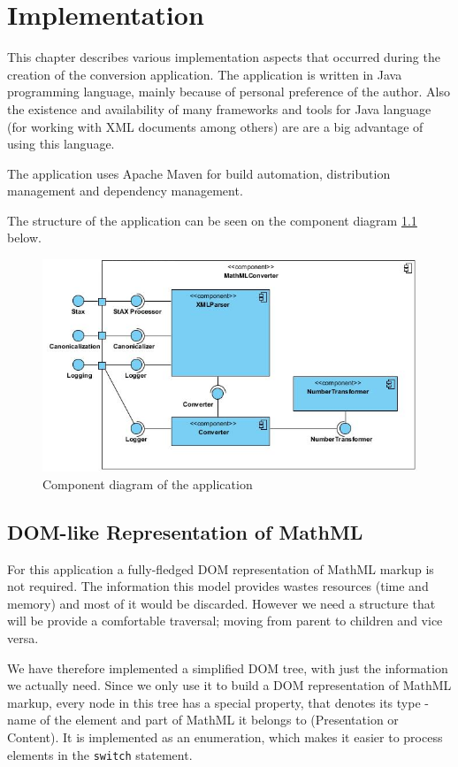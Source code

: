 \documentclass[11pt,oneside,final]{fithesis2}
\begin{document}
\chapter{Implementation}
This chapter describes various implementation aspects that occurred during the creation of the conversion application. The application is written in Java programming language, mainly because of personal preference of the author. Also the existence and availability of many frameworks and tools for Java language (for working with XML documents among others) are are a big advantage of using this language. 

The application uses Apache Maven for build automation, distribution management and dependency management.

The structure of the application can be seen on the component diagram \ref{fig:componentdiagram} below.

\begin{figure}[!ht]
\centering
\includegraphics[width=\textwidth]{component_diagram}
\caption{Component diagram of the application}
\label{fig:componentdiagram}
\end{figure}

\section{DOM-like Representation of MathML}
For this application a fully-fledged DOM representation of MathML markup is not required. The information this model provides wastes resources (time and memory) and most of it would be discarded. However we need a structure that will be provide a comfortable traversal; moving from parent to children and vice versa.

We have therefore implemented a simplified DOM tree, with just the information we actually need. Since we only use it to build a DOM representation of MathML markup, every node in this tree has a special property, that denotes its type - name of the element and part of MathML it belongs to (Presentation or Content). It is implemented as an enumeration, which makes it easier to process elements in the \texttt{switch} statement.
\end{document}
